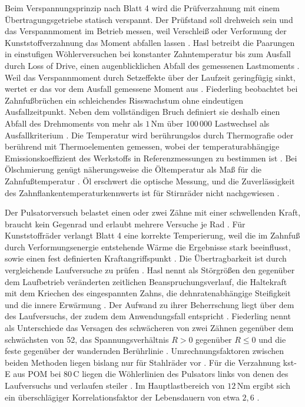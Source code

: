 Beim Verspannungsprinzip nach Blatt 4 wird die Prüfverzahnung mit einem Übertragungsgetriebe statisch verspannt. Der Prüfstand soll drehweich sein und das Verspannmoment im Betrieb messen, weil Verschleiß oder Verformung der Kunststoffverzahnung das Moment abfallen lassen \cite[Abschnitt~5.2, S.~11]{VDI2736-4}. Hasl betreibt die Paarungen in einstufigen Wöhlerversuchen bei konstanter Zahntemperatur bis zum Ausfall durch Loss of Drive, einen augenblicklichen Abfall des gemessenen Lastmoments \cite[Abschnitt~7.2, S.~91]{Has18}. Weil das Verspannmoment durch Setzeffekte über der Laufzeit geringfügig sinkt, wertet er das vor dem Ausfall gemessene Moment aus \cite[S.~91]{Has18}. Fiederling beobachtet bei Zahnfußbrüchen ein schleichendes Risswachstum ohne eindeutigen Ausfallzeitpunkt. Neben dem vollständigen Bruch definiert sie deshalb einen Abfall des Drehmoments von mehr als $1$\,Nm über 100\,000 Lastwechsel als Ausfallkriterium \cite[Abschnitt~6.1, S.~65]{Fie23}. Die Temperatur wird berührungslos durch Thermografie oder berührend mit Thermoelementen gemessen, wobei der temperaturabhängige Emissionskoeffizient des Werkstoffs in Referenzmessungen zu bestimmen ist \cite[Abschnitt~8.2, S.~16]{VDI2736-4}. Bei Ölschmierung genügt näherungsweise die Öltemperatur als Maß für die Zahnfußtemperatur \cite[Abschnitt~8.2.2, S.~16]{VDI2736-4}. Öl erschwert die optische Messung, und die Zuverlässigkeit des Zahnflankentemperaturkennwerts ist für Stirnräder nicht nachgewiesen \cite[S.~16 und 18]{VDI2736-4}.


Der Pulsatorversuch belastet einen oder zwei Zähne mit einer schwellenden Kraft, braucht kein Gegenrad und erlaubt mehrere Versuche je Rad \cite[Abschnitt~2.2.2, S.~12]{Fie23}. Für Kunststoffräder verlangt Blatt 4 eine korrekte Temperierung, weil die im Zahnfuß durch Verformungsenergie entstehende Wärme die Ergebnisse stark beeinflusst, sowie einen fest definierten Kraftangriffspunkt \cite[Abschnitt~5.3, S.~12]{VDI2736-4}. Die Übertragbarkeit ist durch vergleichende Laufversuche zu prüfen \cite[S.~12]{VDI2736-4}. Hasl nennt als Störgrößen den gegenüber dem Laufbetrieb veränderten zeitlichen Beanspruchungsverlauf, die Haltekraft mit dem Kriechen des eingespannten Zahns, die dehnratenabhängige Steifigkeit und die innere Erwärmung \cite[Abschnitt~5.1, S.~61 bis 62]{Has18}. Der Aufwand zu ihrer Beherrschung liegt über dem des Laufversuchs, der zudem dem Anwendungsfall entspricht \cite[S.~62]{Has18}. Fiederling nennt als Unterschiede das Versagen des schwächeren von zwei Zähnen gegenüber dem schwächsten von 52, das Spannungsverhältnis $R > 0$ gegenüber $R \le 0$ und die feste gegenüber der wandernden Berührlinie \cite[Abschnitt~2.2.3, S.~14 bis 15]{Fie23}. Umrechnungsfaktoren zwischen beiden Methoden liegen bislang nur für Stahlräder vor \cite[S.~15]{Fie23}. Für die Verzahnung kst-E aus POM bei $80$\,\textdegree C liegen die Wöhlerlinien des Pulsators links von denen des Laufversuchs und verlaufen steiler \cite[Abschnitt~8.1, S.~105 bis 106]{Fie23}. Im Hauptlastbereich von $12$\,Nm ergibt sich ein überschlägiger Korrelationsfaktor der Lebensdauern von etwa $2{,}6$ \cite[S.~106]{Fie23}.

